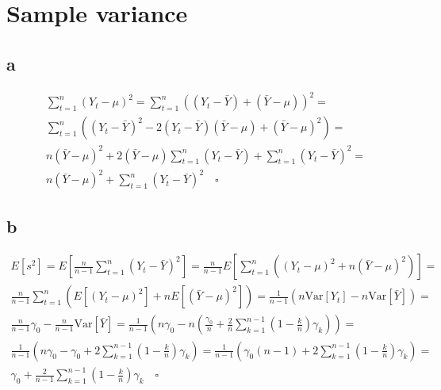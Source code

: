 \documentclass[]{book}
\theoremstyle{definition}
\theoremstyle{definition}
\theoremstyle{remark}
\begin{document}
\section{Sample variance}\label{sample-variance}

\subsection*{a}\label{a-12}

\begin{gather*}
  \sum_{t=1}^n (Y_t - \mu)^2 = \sum_{t=1}^n((Y_t - \bar{Y}) + (\bar{Y} - \mu))^2 = \\
  \sum_{t=1}^n ((Y_t - \bar{Y})^2 - 2(Y_t - \bar{Y})(\bar{Y}- \mu) + (\bar{Y} - \mu)^2) = \\
  n(\bar{Y} - \mu)^2 + 2(\bar{Y} - \mu)\sum_{t=1}^n (Y_t - \bar{Y}) + \sum_{t=1}^n (Y_t - \bar{Y})^2  = \\
  n(\bar{Y} - \mu)^2 + \sum_{t=1}^n(Y_t - \bar{Y})^2 \quad \square
\end{gather*}

\subsection*{b}\label{b-12}

\begin{gather*}
  E[s^2] = E\left[\frac{n}{n-1} \sum_{t=1}^n (Y_t - \bar{Y})^2 \right] =
    \frac{n}{n-1} E\left[\sum_{t=1}^n \left( (Y_t-\mu)^2  + n(\bar{Y} - \mu)^2 \right)\right] = \\
  \frac{n}{n-1} \sum_{t=1}^n \left( E[(Y_t-\mu)^2]  + nE[(\bar{Y} - \mu)^2] \right) = 
    \frac{1}{n-1} \left( n\text{Var}[Y_t] - n\text{Var}[\bar{Y}] \right) = \\
  \frac{n}{n-1} \gamma_0 - \frac{n}{n-1} \text{Var}[\bar{Y}] =
    \frac{1}{n-1} \left( n \gamma_0 - n \left( \frac{\gamma_0}{n} + \frac{2}{n} \sum_{k=1}^{n-1} \left( 1 - \frac{k}{n} \right) \gamma_k\right) \right) = \\
  \frac{1}{n-1} \left( n \gamma_0 - \gamma_0 + 2 \sum_{k=1}^{n-1} \left( 1 - \frac{k}{n} \right) \gamma_k\right) = 
    \frac{1}{n-1} \left( \gamma_0(n-1) + 2 \sum_{k=1}^{n-1} \left( 1 - \frac{k}{n} \right) \gamma_k\right) = \\
  \gamma_0 + \frac{2}{n-1} \sum_{k=1}^{n-1} \left( 1 - \frac{k}{n} \right) \gamma_k \quad \square
\end{gather*}
\end{document}

